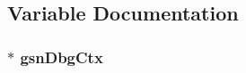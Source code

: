 \subsection{Variable Documentation}
\hypertarget{a00480_a0ea54aaf70383854541f75f1c3345976}{
\subsubsection[{gsnDbgCtx}]{$\ast$ {\bf gsnDbgCtx}}}
\label{a00480_a0ea54aaf70383854541f75f1c3345976}
